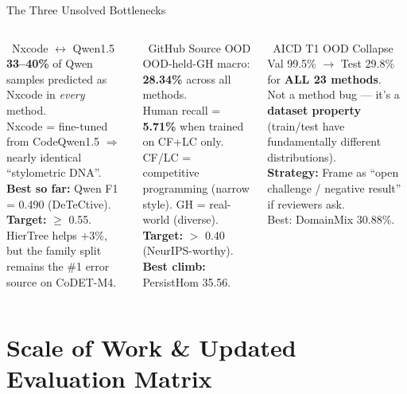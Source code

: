 \documentclass[aspectratio=169, 10pt]{beamer}
\begin{document}
\begin{frame}{The Three Unsolved Bottlenecks}
\vspace{-0.15cm}
\begin{columns}[T]
\begin{alertblock}{\faUsers\ Nxcode $\leftrightarrow$ Qwen1.5}
\small
\textbf{33--40\%} of Qwen samples predicted as Nxcode in \emph{every} method.\\[4pt]
Nxcode = fine-tuned from CodeQwen1.5 $\Rightarrow$ nearly identical ``stylometric DNA''.\\[4pt]
\textbf{Best so far:} Qwen F1 = 0.490 (DeTeCtive).\\
\textbf{Target:} $\geq$ 0.55.\\[4pt]
{\scriptsize HierTree helps +3\%, but the family split remains the \#1 error source on CoDET-M4.}
\end{alertblock}

\begin{alertblock}{\faGlobeAmericas\ GitHub Source OOD}
\small
OOD-held-GH macro: \textbf{28.34\%} across all methods.\\[4pt]
Human recall = \textbf{5.71\%} when trained on CF+LC only.\\[4pt]
CF/LC = competitive programming (narrow style). GH = real-world (diverse).\\[4pt]
\textbf{Target:} $>$ 0.40 (NeurIPS-worthy).\\
\textbf{Best climb:} PersistHom 35.56.
\end{alertblock}

\begin{alertblock}{\faShield*\ AICD T1 OOD Collapse}
\small
Val 99.5\% $\to$ Test 29.8\% for \textbf{ALL 23 methods}.\\[4pt]
Not a method bug --- it's a \textbf{dataset property} (train/test have fundamentally different distributions).\\[4pt]
\textbf{Strategy:} Frame as ``open challenge / negative result'' if reviewers ask.\\[4pt]
{\scriptsize Best: DomainMix 30.88\%.}
\end{alertblock}
\end{columns}
\end{frame}


\section{Scale of Work \& Updated Evaluation Matrix}
\end{document}

